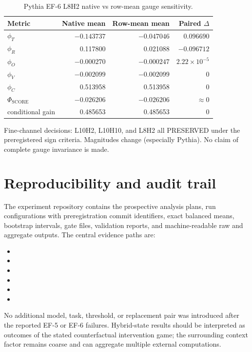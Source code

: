 \documentclass[pdflatex,sn-apa]{sn-jnl}
\begin{document}
\begin{table}[h]
\centering
\caption{Pythia EF-6 L8H2 native vs row-mean gauge sensitivity.}
\begin{tabular}{lrrr}
\toprule
Metric & Native mean & Row-mean mean & Paired $\Delta$ \\
\midrule
$\phi_T$ & $-0.143737$ & $-0.047046$ & $0.096690$ \\
$\phi_R$ & 0.117800 & 0.021088 & $-0.096712$ \\
$\phi_O$ & $-0.000270$ & $-0.000247$ & $2.22\times10^{-5}$ \\
$\phi_V$ & $-0.002099$ & $-0.002099$ & $0$ \\
$\phi_C$ & 0.513958 & 0.513958 & $0$ \\
$\Phi_{\mathrm{SCORE}}$ & $-0.026206$ & $-0.026206$ & $\approx0$ \\
conditional gain & 0.485653 & 0.485653 & $0$ \\
\bottomrule
\end{tabular}
\end{table}

Fine-channel decisions: L10H2, L10H10, and L8H2 all PRESERVED under the
preregistered sign criteria. Magnitudes change (especially Pythia). No claim of
complete gauge invariance is made.

\section{Reproducibility and audit trail}

The experiment repository contains the prospective analysis plans, run
configurations with preregistration commit identifiers, exact balanced means,
bootstrap intervals, gate files, validation reports, and machine-readable raw and
aggregate outputs. The central evidence paths are:

\begin{itemize}
\item {}
\item {}
\item {}
\item {}
\item {}
\item {}
\end{itemize}

No additional model, task, threshold, or replacement pair was introduced after the
reported EF-5 or EF-6 failures. Hybrid-state results should be interpreted as outcomes
of the stated counterfactual intervention game; the surrounding context factor remains
coarse and can aggregate multiple external computations.
\end{document}
